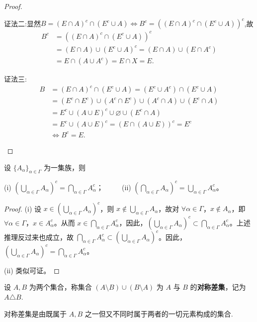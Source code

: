 \documentclass[../../main.tex]{subfiles}%
\begin{document}
\begin{proof}
\begin{enumerate}[(1)]
{\color{blue}证法二:}显然$B=(E\cap A)^c\cap (E^c\cup A)\Longleftrightarrow B^c=\left( (E\cap A)^c\cap (E^c\cup A) \right) ^c$,故
\begin{align*}
B^c&=\left( (E\cap A)^c\cap (E^c\cup A) \right) ^c
\\
&=(E\cap A)\cup (E^c\cup A)^c=(E\cap A)\cup (E\cap A^c)
\\
&=E\cap (A\cup A^c)=E\cap X=E.
\end{align*}

{\color{blue}证法三:}
\begin{align*}
B&=(E\cap A)^c\cap (E^c\cup A)=(E^c\cup A^c)\cap (E^c\cup A)
\\
&=(E^c\cap E^c)\cup (A^c\cap E^c)\cup (A^c\cap A)\cup (E^c\cap A)
\\
&=E^c\cup (A\cup E)^c\cup \varnothing \cup (E^c\cap A)
\\
&=E^c\cup (A\cup E)^c=(E\cap (A\cup E))^c=E^c
\\
&\Longleftrightarrow B^c=E.
\end{align*}
\end{enumerate}
\end{proof}

\begin{theorem}[De Morgan定律]\label{theorem:De Morgan定律}
设 \(\{A_{\alpha}\}_{\alpha \in \varGamma}\) 为一集族，则

(i) \((\bigcup_{\alpha \in \varGamma} A_{\alpha})^c = \bigcap_{\alpha \in \varGamma} A_{\alpha}^c\)；
$\quad \quad$
(ii) \((\bigcap_{\alpha \in \varGamma} A_{\alpha})^c = \bigcup_{\alpha \in \varGamma} A_{\alpha}^c\)。
\end{theorem}
\begin{proof}
(i) 设 \(x \in (\bigcup_{\alpha \in \varGamma} A_{\alpha})^c\)，则 \(x \notin \bigcup_{\alpha \in \varGamma} A_{\alpha}\)，故对 \(\forall \alpha \in \varGamma\)，\(x \notin A_{\alpha}\)，即 \(\forall \alpha \in \varGamma\)，\(x \in A_{\alpha}^c\)。从而 \(x \in \bigcap_{\alpha \in \varGamma} A_{\alpha}^c\)，因此，\((\bigcup_{\alpha \in \varGamma} A_{\alpha})^c \subset \bigcap_{\alpha \in \varGamma} A_{\alpha}^c\)。上述推理反过来也成立，故 \(\bigcap_{\alpha \in \varGamma} A_{\alpha}^c \subset (\bigcup_{\alpha \in \varGamma} A_{\alpha})^c\)。因此，\((\bigcup_{\alpha \in \varGamma} A_{\alpha})^c = \bigcap_{\alpha \in \varGamma} A_{\alpha}^c\)。

(ii) 类似可证。 
\end{proof}

\begin{definition}[对称差集]
设 \( A,B \) 为两个集合，称集合 \( (A \setminus B) \cup (B \setminus A) \) 为 \( A \) 与 \( B \) 的\textbf{对称差集}，记为 \( A \triangle B \).
\end{definition}
\begin{note}
对称差集是由既属于 \( A,B \) 之一但又不同时属于两者的一切元素构成的集合.
\end{note}
\end{document}
